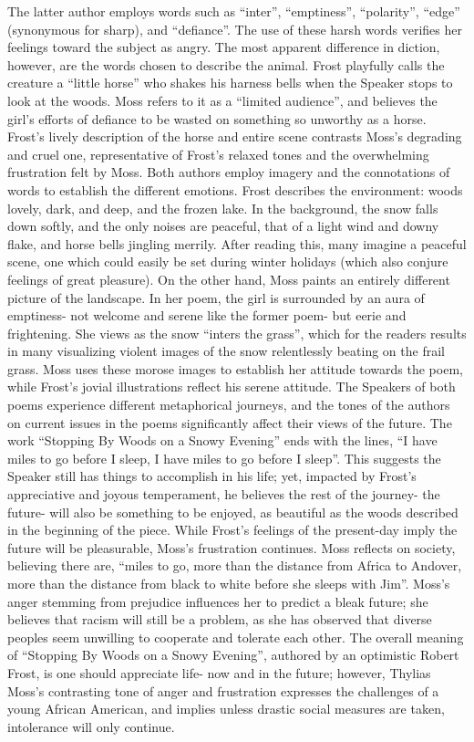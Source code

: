 \begin{spacing}{2}
\begin{linenumbers*}
\indent The latter author employs words such as “inter”, “emptiness”, “polarity”, “edge” (synonymous for sharp), and “defiance”. The use of these harsh words verifies her feelings toward the subject as angry. The most apparent difference in diction, however, are the words chosen to describe the animal. Frost playfully calls the creature a “little horse” who shakes his harness bells when the Speaker stops to look at the woods. Moss refers to it as a “limited audience”, and believes the girl's efforts of defiance to be wasted on something so unworthy as a horse. Frost's lively description of the horse and entire scene contrasts Moss's degrading and cruel one, representative of Frost's relaxed tones and the overwhelming frustration felt by Moss. Both authors employ imagery and the connotations of words to establish the different emotions. Frost describes the environment: woods lovely, dark, and deep, and the frozen lake. In the background, the snow falls down softly, and the only noises are peaceful, that of a light wind and downy flake, and horse bells jingling merrily. After reading this, many imagine a peaceful scene, one which could easily be set during winter holidays (which also conjure feelings of great pleasure). On the other hand, Moss paints an entirely different picture of the landscape. In her poem, the girl is surrounded by an aura of emptiness- not welcome and serene like the former poem- but eerie and frightening. She views as the snow “inters the grass”, which for the readers results in many visualizing violent images of the snow relentlessly beating on the frail grass. Moss uses these morose images to establish her attitude towards the poem, while Frost's jovial illustrations reflect his serene attitude. The Speakers of both poems experience different metaphorical journeys, and the tones of the authors on current issues in the poems significantly affect their views of the future. The work “Stopping By Woods on a Snowy Evening” ends with the lines, “I have miles to go before I sleep, I have miles to go before I sleep”. This suggests the Speaker still has things to accomplish in his life; yet, impacted by Frost's appreciative and joyous temperament, he believes the rest of the journey- the future- will also be something to be enjoyed, as beautiful as the woods described in the beginning of the piece. While Frost's feelings of the present-day imply the future will be pleasurable, Moss's frustration continues. Moss reflects on society, believing there are, “miles to go, more than the distance from Africa to Andover, more than the distance from black to white before she sleeps with Jim”. Moss's anger stemming from prejudice influences her to predict a bleak future; she believes that racism will still be a problem, as she has observed that diverse peoples seem unwilling to cooperate and tolerate each other. The overall meaning of “Stopping By Woods on a Snowy Evening”, authored by an optimistic Robert Frost, is one should appreciate life- now and in the future; however, Thylias Moss's contrasting tone of anger and frustration expresses the challenges of a young African American, and implies unless drastic social measures are taken, intolerance will only continue.     

\end{linenumbers*}
\end{spacing}

